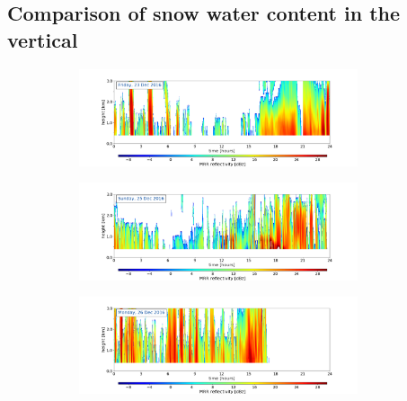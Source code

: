 \subsection{Comparison of snow water content in the vertical}%
\label{sec:res:large_scale_vert}
\begin{figure}[h!]
	\centering
	\begin{subfigure}[t]{\textwidth}
		\centering
		\includegraphics[trim={4.cm 2.5cm 4.5cm 1.5cm},clip,width=0.9\textwidth]{./fig_MRR_refl/MRR_20161223}
		\caption{}\label{fig:ret:refl23}
	\end{subfigure}
	\begin{subfigure}[t]{\textwidth}
		\centering
		\includegraphics[trim={4.cm 2.5cm 4.5cm 1.5cm},clip,width=0.9\textwidth]{./fig_MRR_refl/MRR_20161225}
		\caption{}\label{fig:ret:refl25}
	\end{subfigure}
	\begin{subfigure}[t]{\textwidth}
		\centering
		\includegraphics[trim={4.cm 2.5cm 4.5cm 1.5cm},clip,width=0.9\textwidth]{./fig_MRR_refl/MRR_20161226}
		\caption{}\label{fig:ret:refl26}
	\end{subfigure}

\end{figure}
